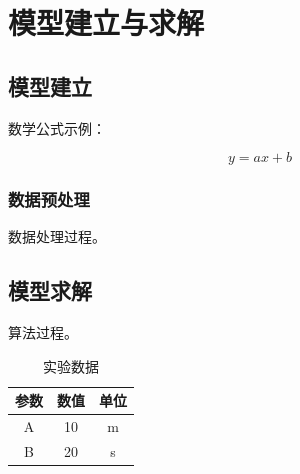 
\section{模型建立与求解}


\subsection{模型建立}


数学公式示例：

\[
y=ax+b
\]


\subsubsection{数据预处理}


数据处理过程。



\subsection{模型求解}


算法过程。













\begin{table}[htbp]

\centering

\caption{实验数据}

\begin{tabular}{ccc}

\toprule

参数 & 数值 & 单位\\

\midrule

A & 10 & m\\

B & 20 & s\\

\bottomrule

\end{tabular}
\end{table}

